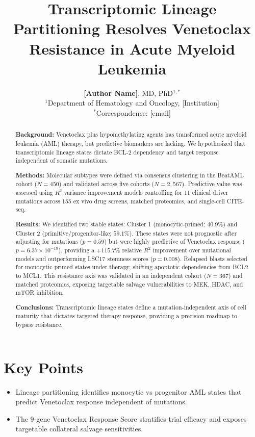 \documentclass[11pt,a4paper]{article}
\title{\Large\textbf{Transcriptomic Lineage Partitioning Resolves Venetoclax Resistance in Acute Myeloid Leukemia}}
\author{
\textbf{[Author Name]}, MD, PhD$^{1,*}$ \\[0.3cm]
\small $^1$Department of Hematology and Oncology, [Institution] \\[0.2cm]
\small $^*$Correspondence: [email]
}
\date{}
\begin{document}
\maketitle


\section*{Key Points}
\begin{itemize}
\item Lineage partitioning identifies monocytic vs progenitor AML states that predict Venetoclax response independent of mutations.
\item The 9-gene Venetoclax Response Score stratifies trial efficacy and exposes targetable collateral salvage sensitivities.
\end{itemize}

\begin{abstract}
\sloppy
\noindent\textbf{Background:} Venetoclax plus hypomethylating agents has transformed acute myeloid leukemia (AML) therapy, but predictive biomarkers are lacking. We hypothesized that transcriptomic lineage states dictate BCL-2 dependency and target response independent of somatic mutations.

\noindent\textbf{Methods:} Molecular subtypes were defined via consensus clustering in the BeatAML cohort ($N=450$) and validated across five cohorts ($N=2{,}567$). Predictive value was assessed using $R^2$ variance improvement models controlling for 11 clinical driver mutations across 155 ex vivo drug screens, matched proteomics, and single-cell CITE-seq.

\noindent\textbf{Results:} We identified two stable states: Cluster 1 (monocytic-primed; $40.9\%$) and Cluster 2 (primitive/progenitor-like; $59.1\%$). These states were not prognostic after adjusting for mutations ($p=0.59$) but were highly predictive of Venetoclax response ($p=6.37\times10^{-19}$), providing a $+115.7\%$ relative $R^2$ improvement over mutational models and outperforming LSC17 stemness scores ($p=0.008$). Relapsed blasts selected for monocytic-primed states under therapy, shifting apoptotic dependencies from BCL2 to MCL1. This resistance axis was validated in an independent cohort ($N=367$) and matched proteomics, exposing targetable salvage vulnerabilities to MEK, HDAC, and mTOR inhibition.

\noindent\textbf{Conclusions:} Transcriptomic lineage states define a mutation-independent axis of cell maturity that dictates targeted therapy response, providing a precision roadmap to bypass resistance.
\end{abstract}
\end{document}
